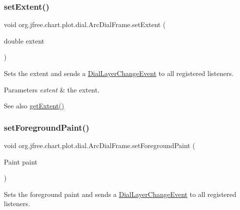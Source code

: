 \subsubsection{\texorpdfstring{set\+Extent()}{setExtent()}}
{\footnotesize\ttfamily void org.\+jfree.\+chart.\+plot.\+dial.\+Arc\+Dial\+Frame.\+set\+Extent (\begin{DoxyParamCaption}\item[{double}]{extent }\end{DoxyParamCaption})}

Sets the extent and sends a \mbox{\hyperlink{classorg_1_1jfree_1_1chart_1_1plot_1_1dial_1_1_dial_layer_change_event}{Dial\+Layer\+Change\+Event}} to all registered listeners.


\begin{DoxyParams}{Parameters}
{\em extent} & the extent.\\
\hline
\end{DoxyParams}
\begin{DoxySeeAlso}{See also}
\mbox{\hyperlink{classorg_1_1jfree_1_1chart_1_1plot_1_1dial_1_1_arc_dial_frame_afbdb29587f4c8b558a4eb5401fe333d4}{get\+Extent()}} 
\end{DoxySeeAlso}
\mbox{\label{classorg_1_1jfree_1_1chart_1_1plot_1_1dial_1_1_arc_dial_frame_a5f5ee601d06bf9d0c0e447b8ec3ec969}} 
\subsubsection{\texorpdfstring{set\+Foreground\+Paint()}{setForegroundPaint()}}
{\footnotesize\ttfamily void org.\+jfree.\+chart.\+plot.\+dial.\+Arc\+Dial\+Frame.\+set\+Foreground\+Paint (\begin{DoxyParamCaption}\item[{Paint}]{paint }\end{DoxyParamCaption})}

Sets the foreground paint and sends a \mbox{\hyperlink{classorg_1_1jfree_1_1chart_1_1plot_1_1dial_1_1_dial_layer_change_event}{Dial\+Layer\+Change\+Event}} to all registered listeners.


